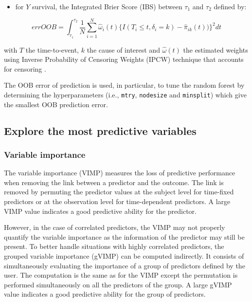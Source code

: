 \begin{itemize}
\tightlist
\item
  for \(Y\) survival, the Integrated Brier Score (IBS) \citep{sene_individualized_2016} between \(\tau_1\) and \(\tau_2\) defined by:
\end{itemize}

\begin{equation}
  errOOB = \int_{\tau_1}^{\tau_2} \frac{1}{N} \sum_{i=1}^{N}  \hat{\omega}_i(t) \Big\{ I(T_i \leq t, \delta_i = k) -
  \hat{\pi}_{ik}(t) \Big) \Big\}^2 dt
\end{equation}

with \(T\) the time-to-event, \(k\) the cause of interest and \(\hat{\omega}(t)\) the estimated weights using Inverse Probability of Censoring Weights (IPCW) technique that accounts for censoring \citep{gerds_consistent_2006}.

The OOB error of prediction is used, in particular, to tune the random forest by determining the hyperparameters (i.e., \texttt{mtry}, \texttt{nodesize} and \texttt{minsplit}) which give the smallest OOB prediction error.

\subsection{Explore the most predictive variables}\label{explore-the-most-predictive-variables}

\subsubsection{Variable importance}\label{variable-importance}

The variable importance (VIMP) measures the loss of predictive performance \citep{ishwaran_random_2008} when removing the link between a predictor and the outcome. The link is removed by permuting the predictor values at the subject level for time-fixed predictors or at the observation level for time-dependent predictors. A large VIMP value indicates a good predictive ability for the predictor.

However, in the case of correlated predictors, the VIMP may not properly quantify the variable importance \citep{gregorutti_correlation_2017} as the information of the predictor may still be present. To better handle situations with highly correlated predictors, the grouped variable importance (gVIMP) can be computed indirectly. It consists of simultaneously evaluating the importance of a group of predictors defined by the user. The computation is the same as for the VIMP except the permutation is performed simultaneously on all the predictors of the group. A large gVIMP value indicates a good predictive ability for the group of predictors.

